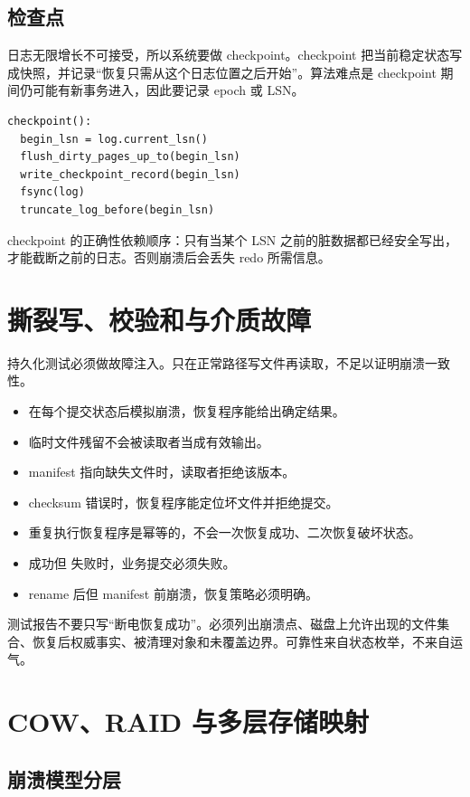 \subsection{检查点}

日志无限增长不可接受，所以系统要做 checkpoint。checkpoint 把当前稳定状态写成快照，并记录“恢复只需从这个日志位置之后开始”。算法难点是 checkpoint 期间仍可能有新事务进入，因此要记录 epoch 或 LSN。

\begin{lstlisting}
checkpoint():
  begin_lsn = log.current_lsn()
  flush_dirty_pages_up_to(begin_lsn)
  write_checkpoint_record(begin_lsn)
  fsync(log)
  truncate_log_before(begin_lsn)
\end{lstlisting}

checkpoint 的正确性依赖顺序：只有当某个 LSN 之前的脏数据都已经安全写出，才能截断之前的日志。否则崩溃后会丢失 redo 所需信息。

\section{撕裂写、校验和与介质故障}

持久化测试必须做故障注入。只在正常路径写文件再读取，不足以证明崩溃一致性。

\begin{itemize}
\tightlist
\item 在每个提交状态后模拟崩溃，恢复程序能给出确定结果。
\item 临时文件残留不会被读取者当成有效输出。
\item manifest 指向缺失文件时，读取者拒绝该版本。
\item checksum 错误时，恢复程序能定位坏文件并拒绝提交。
\item 重复执行恢复程序是幂等的，不会一次恢复成功、二次恢复破坏状态。
\item {} 成功但  失败时，业务提交必须失败。
\item rename 后但 manifest 前崩溃，恢复策略必须明确。
\end{itemize}

测试报告不要只写“断电恢复成功”。必须列出崩溃点、磁盘上允许出现的文件集合、恢复后权威事实、被清理对象和未覆盖边界。可靠性来自状态枚举，不来自运气。

\section{COW、RAID 与多层存储映射}

\subsection{崩溃模型分层}

